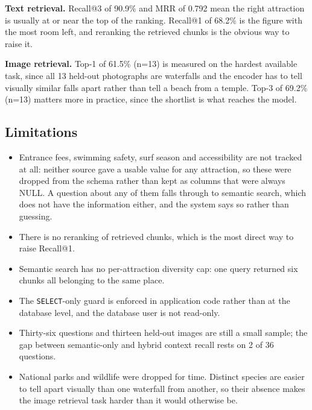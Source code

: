\documentclass[11pt,a4paper]{article}
\newcommand{\code}[1]{\texttt{\small #1}}
\begin{document}
\textbf{Text retrieval.} Recall@3 of 90.9\% and MRR of 0.792 mean the
right attraction is usually at or near the top of the ranking. Recall@1 of
68.2\% is the figure with the most room left, and reranking the retrieved
chunks is the obvious way to raise it.

\textbf{Image retrieval.} Top-1 of 61.5\% (n=13) is measured on the hardest
available task, since all 13 held-out photographs are waterfalls and the
encoder has to tell visually similar falls apart rather than tell a beach
from a temple. Top-3 of 69.2\% (n=13) matters more in practice, since the
shortlist is what reaches the model.

\subsection{Limitations}

\begin{itemize}
  \item Entrance fees, swimming safety, surf season and accessibility are not
        tracked at all: neither source gave a usable value for any
        attraction, so these were dropped from the schema rather than kept
        as columns that were always NULL. A question about any of them falls
        through to semantic search, which does not have the information
        either, and the system says so rather than guessing.
  \item There is no reranking of retrieved chunks, which is the most direct
        way to raise Recall@1.
  \item Semantic search has no per-attraction diversity cap: one query
        returned six chunks all belonging to the same place.
  \item The \code{SELECT}-only guard is enforced in application code rather
        than at the database level, and the database user is not read-only.
  \item Thirty-six questions and thirteen held-out images are still a small
        sample; the gap between semantic-only and hybrid context recall
        rests on 2 of 36 questions.
  \item National parks and wildlife were dropped for time. Distinct species
        are easier to tell apart visually than one waterfall from another,
        so their absence makes the image retrieval task harder than it would
        otherwise be.
\end{itemize}

\end{document}
